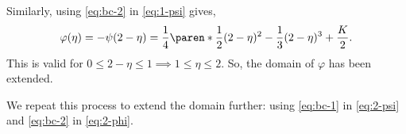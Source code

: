 \documentclass[11pt]{penrose}
\begin{document}
\begin{problem}{6}
    Similarly, using \eqref{eq:bc-2} in \eqref{eq:1-psi} gives,
    \begin{equation}
        \varphi(\eta)
        = -\psi(2-\eta)
        = \frac{1}{4} \paren*{\frac{1}{2}(2-\eta)^2 - \frac{1}{3}(2-\eta)^3} + \frac{K}{2}. \label{eq:2-phi}
    \end{equation}
    This is valid for $0 \leq 2-\eta \leq 1 \implies 1 \leq \eta \leq 2$. So, the domain of $\varphi$ has been extended.

    We repeat this process to extend the domain further: using \eqref{eq:bc-1} in \eqref{eq:2-psi} and \eqref{eq:bc-2} in \eqref{eq:2-phi}.
\end{problem}
\end{document}
